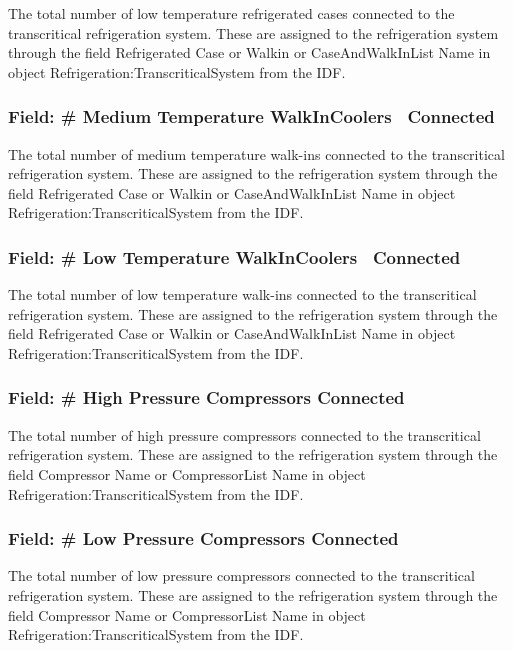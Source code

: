 The total number of low temperature refrigerated cases connected to the transcritical refrigeration system. These are assigned to the refrigeration system through the field Refrigerated Case or Walkin or CaseAndWalkInList Name in object Refrigeration:TranscriticalSystem from the IDF.

\subsubsection{Field: \# Medium Temperature WalkInCoolers~ Connected}\label{field-medium-temperature-walkincoolers-connected}

The total number of medium temperature walk-ins connected to the transcritical refrigeration system. These are assigned to the refrigeration system through the field Refrigerated Case or Walkin or CaseAndWalkInList Name in object Refrigeration:TranscriticalSystem from the IDF.

\subsubsection{Field: \# Low Temperature WalkInCoolers~ Connected}\label{field-low-temperature-walkincoolers-connected}

The total number of low temperature walk-ins connected to the transcritical refrigeration system. These are assigned to the refrigeration system through the field Refrigerated Case or Walkin or CaseAndWalkInList Name in object Refrigeration:TranscriticalSystem from the IDF.

\subsubsection{Field: \# High Pressure Compressors Connected}\label{field-high-pressure-compressors-connected}

The total number of high pressure compressors connected to the transcritical refrigeration system. These are assigned to the refrigeration system through the field Compressor Name or CompressorList Name in object Refrigeration:TranscriticalSystem from the IDF.

\subsubsection{Field: \# Low Pressure Compressors Connected}\label{field-low-pressure-compressors-connected}

The total number of low pressure compressors connected to the transcritical refrigeration system. These are assigned to the refrigeration system through the field Compressor Name or CompressorList Name in object Refrigeration:TranscriticalSystem from the IDF.

